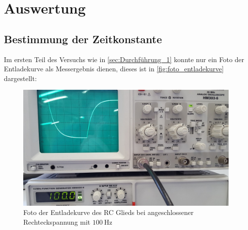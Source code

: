 \section{Auswertung}
\label{sec:Auswertung}



\subsection{Bestimmung der Zeitkonstante}
\label{sec:Auswertung_Zeitkonstante}

Im ersten Teil des Versuchs wie in \autoref{sec:Durchführung_1} konnte nur ein Foto der Entladekurve als Messergebnis dienen, dieses ist in \autoref{fig:foto_entladekurve} dargestellt:

\begin{figure}
    \centering
    \includegraphics[width=\textwidth]{images/foto_01.jpg}
    \caption{Foto der Entladekurve des RC Glieds bei angeschlossener Rechteckspannung mit $\SI{100}{\hertz}$}
    \label{fig:foto_entladekurve}
\end{figure}

